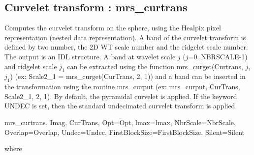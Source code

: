 \subsection{Curvelet transform : mrs\_curtrans}
Computes the curvelet transform on the sphere, using the Healpix pixel representation (nested data representation). 
A band of the curvelet transform is defined by two number, the 2D WT scale number and the ridgelet scale number. 
The output is an IDL structure. A band at wavelet scale $j$ ($j$=0..NBRSCALE-1) and ridgelet scale $j_1$ can be 
extracted using the function mrs\_curget(Curtrans, $j$, $j_1$) (ex: Scale2\_1 = mrs\_curget(CurTrans, 2, 1)) and 
a band can be inserted in the transformation using the routine mrs\_curput (ex: mrs\_curput, CurTrans, Scale2\_1, 2, 1). 
By default, the pyramidal curvelet is applied. If the keyword UNDEC is set, then the standard undecimated curvelet transform is applied.
{\bf
\begin{center}
       mrs\_curtrans, Imag, CurTrans, Opt=Opt, lmax=lmax, NbrScale=NbrScale, Overlap=Overlap, Undec=Undec, FirstBlockSize=FirstBlockSize, Silent=Silent
\end{center}}
where
